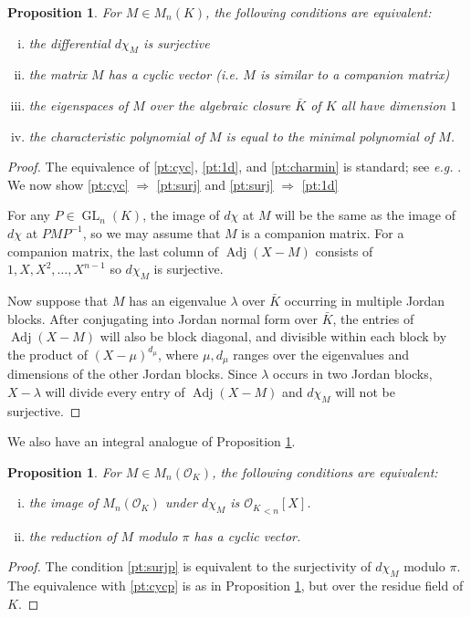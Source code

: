 \documentclass[sigconf]{acmart}
\DeclareMathOperator{\GL}{GL}
\DeclareMathOperator{\adj}{Adj}
\newcommand{\OK}{\mathcal{O}_K}
\newtheorem{prop}[theo]{Proposition}
\theoremstyle{definition}
\begin{document}
\begin{prop}
\label{prop:surjectivity}
For $M \in M_n(K)$, the following conditions are equivalent:
\begin{enumerate}[(i)]
\renewcommand{\itemsep}{0pt}
\item \label{pt:surj} the differential $d\chi_M$ is surjective
\item \label{pt:cyc} the matrix $M$ has a cyclic vector (\emph{i.e.} $M$ is similar
to a companion matrix)
\item \label{pt:1d} the eigenspaces of $M$ over the algebraic
closure $\bar{K}$ of $K$ all have dimension $1$
\item \label{pt:charmin} the characteristic polynomial of $M$ is equal to the minimal polynomial of $M$.
\end{enumerate}
\end{prop}

\begin{proof}
The equivalence of \eqref{pt:cyc}, \eqref{pt:1d}, and \eqref{pt:charmin} is standard; see \emph{e.g.}
\cite[\S 7.1]{hoffman-kunze:LinearAlgebra}.  We now show
\eqref{pt:cyc} $\Rightarrow$ \eqref{pt:surj} and \eqref{pt:surj} $\Rightarrow$ \eqref{pt:1d}

For any $P \in \GL_n(K)$, the image of $d\chi$ at $M$ will be the same
as the image of $d\chi$ at $PMP^{-1}$, so we may assume that
$M$ is a companion matrix.  For a companion matrix, the last column of
$\adj(X{-}M)$ consists of $1, X, X^2, \dots, X^{n-1}$ so $d\chi_M$ is surjective.

Now suppose that $M$ has an eigenvalue $\lambda$ over $\bar{K}$ occurring in multiple Jordan blocks.
After conjugating into Jordan normal form over $\bar{K}$, the entries of $\adj(X{-}M)$
will also be block diagonal, and divisible within each block by the product of $(X-\mu)^{d_\mu}$,
where $\mu, d_\mu$ ranges over the eigenvalues and dimensions of the other Jordan blocks.
Since $\lambda$ occurs in two Jordan blocks,
$X - \lambda$ will divide every entry of $\adj(X{-}M)$ and $d\chi_M$ will not be surjective.
\end{proof}

We also have an integral analogue of Proposition \ref{prop:surjectivity}.

\begin{prop}
\label{prop:intsurj}
For $M \in M_n(\OK)$, the following conditions are equivalent:
\begin{enumerate}[(i)]
\renewcommand{\itemsep}{0pt}
\item \label{pt:surjp} the image of $M_n(\OK)$ under $d\chi_M$ is 
${\OK}_{<n}[X]$.
\item \label{pt:cycp} the reduction of $M$ modulo $\pi$ has a cyclic vector.
\end{enumerate}
\end{prop}
\begin{proof}
The condition \eqref{pt:surjp} is equivalent to the surjectivity of $d\chi_M$ modulo $\pi$.  The equivalence with
\eqref{pt:cycp} is as in Proposition \ref{prop:surjectivity}, but over the residue field of $K$.
\end{proof}
\end{document}

